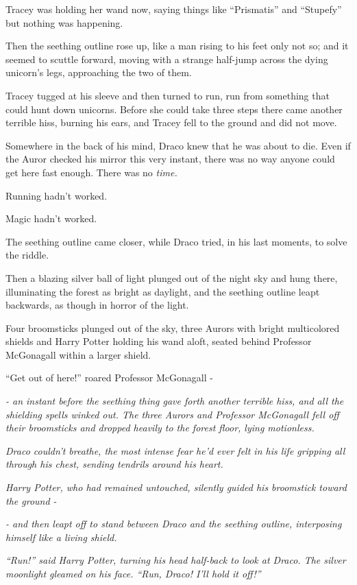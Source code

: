 Tracey was holding her wand now, saying things like ``Prismatis'' and
``Stupefy'' but nothing was happening.

Then the seething outline rose up, like a man rising to his feet only
not so; and it seemed to scuttle forward, moving with a strange
half-jump across the dying unicorn's legs, approaching the two of them.

Tracey tugged at his sleeve and then turned to run, run from something
that could hunt down unicorns. Before she could take three steps there
came another terrible hiss, burning his ears, and Tracey fell to the
ground and did not move.

Somewhere in the back of his mind, Draco knew that he was about to die.
Even if the Auror checked his mirror this very instant, there was no way
anyone could get here fast enough. There was no \emph{time.}

Running hadn't worked.

Magic hadn't worked.

The seething outline came closer, while Draco tried, in his last
moments, to solve the riddle.

Then a blazing silver ball of light plunged out of the night sky and
hung there, illuminating the forest as bright as daylight, and the
seething outline leapt backwards, as though in horror of the light.

Four broomsticks plunged out of the sky, three Aurors with bright
multicolored shields and Harry Potter holding his wand aloft, seated
behind Professor McGonagall within a larger shield.

``Get out of here!'' roared Professor McGonagall -

\emph{- an instant before the seething thing gave forth another terrible
hiss, and all the shielding spells winked out. The three Aurors and
Professor McGonagall fell off their broomsticks and dropped heavily to
the forest floor, lying motionless.}

\emph{Draco couldn't breathe, the most intense fear he'd ever felt in
his life gripping all through his chest, sending tendrils around his
heart.}

\emph{Harry Potter, who had remained untouched, silently guided his
broomstick toward the ground -}

\emph{- and then leapt off to stand between Draco and the seething
outline, interposing himself like a living shield.}

\emph{``Run!'' said Harry Potter, turning his head half-back to look at
Draco. The silver moonlight gleamed on his face. ``Run, Draco! I'll hold
it off!''}

